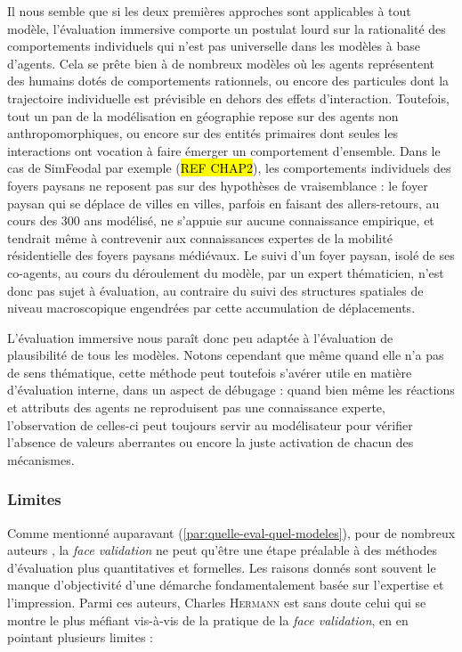 Il nous semble que si les deux premières approches sont applicables à tout modèle, l'évaluation immersive comporte un postulat lourd sur la rationalité des comportements individuels qui n'est pas universelle dans les modèles à base d'agents.
Cela se prête bien à de nombreux modèles où les agents représentent des humains dotés de comportements rationnels, ou encore des particules dont la trajectoire individuelle est prévisible en dehors des effets d'interaction.
Toutefois, tout un pan de la modélisation en géographie repose sur des agents non anthropomorphiques, ou encore sur des entités primaires dont seules les interactions ont vocation à faire émerger un comportement d'ensemble.
Dans le cas de SimFeodal par exemple (\hl{REF CHAP2}), les comportements individuels des foyers paysans ne reposent pas sur des hypothèses de vraisemblance : le foyer paysan qui se déplace de villes en villes, parfois en faisant des allers-retours, au cours des 300 ans modélisé, ne s'appuie sur aucune connaissance empirique, et tendrait même à contrevenir aux connaissances expertes de la mobilité résidentielle des foyers paysans médiévaux.
Le suivi d'un foyer paysan, isolé de ses co-agents, au cours du déroulement du modèle, par un expert thématicien, n'est donc pas sujet à évaluation, au contraire du suivi des structures spatiales de niveau macroscopique engendrées par cette accumulation de déplacements.

L'évaluation immersive nous paraît donc peu adaptée à l'évaluation de plausibilité de tous les modèles.
Notons cependant que même quand elle n'a pas de sens thématique, cette méthode peut toutefois s'avérer utile en matière d'évaluation interne, dans un aspect de \og débugage\fg{} : quand bien même les réactions et attributs des agents ne reproduisent pas une connaissance experte, l'observation de celles-ci peut toujours servir au modélisateur pour vérifier l'absence de valeurs aberrantes ou encore la juste activation de chacun des mécanismes.


\subsubsection{Limites}

Comme mentionné auparavant (\ref{par:quelle-eval-quel-modeles}), pour de nombreux auteurs \autocite{hermann_validation_1967, balci_validation_1994, kennedy_verification_2006}, la \textit{face validation} ne peut qu'être une étape préalable à des méthodes d'évaluation plus quantitatives et formelles.
Les raisons donnés sont souvent le manque d'objectivité d'une démarche fondamentalement basée sur l'expertise et l'impression.
Parmi ces auteurs, Charles H\textsc{ermann} est sans doute celui qui se montre le plus méfiant vis-à-vis de la pratique de la \textit{face validation}, en en pointant plusieurs limites :

